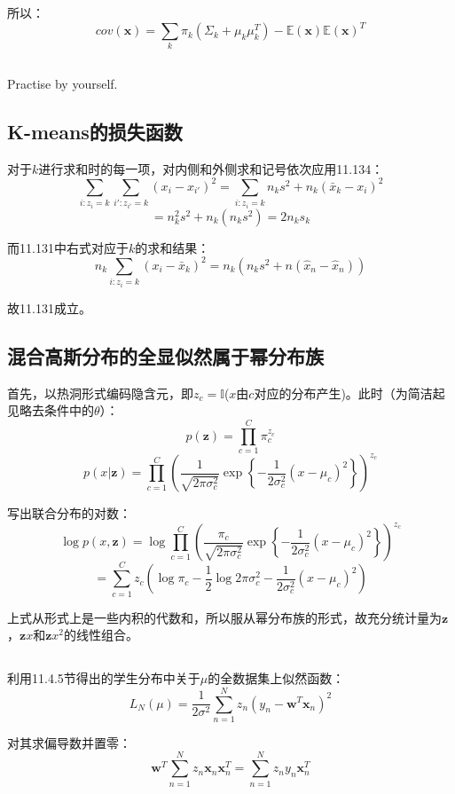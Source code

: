\documentclass[UTF8]{ctexart}
\begin{document}
所以：
$$cov(\textbf{x})=\sum_{k}\pi_{k}(\Sigma_{k}+\mu_{k}\mu_{k}^{T})-\mathbb{E}(\textbf{x})\mathbb{E}(\textbf{x})^{T}$$

\subsection{}
Practise by yourself.

\subsection{K-means的损失函数}
对于$k$进行求和时的每一项，对内侧和外侧求和记号依次应用11.134：
$$\sum_{i:z_{i}=k}\sum_{i':z_{i'}=k}(x_{i}-x_{i'})^{2}=\sum_{i:z_{i}=k}n_{k}s^{2}+n_{k}(\bar{x}_{k}-x_{i})^{2}$$
$$=n_{k}^{2}s^{2}+n_{k}(n_{k}s^{2})=2n_{k}s_{k}$$

而11.131中右式对应于$k$的求和结果：
$$n_{k}\sum_{i:z_{i}=k}(x_{i}-\bar{x}_{k})^{2}=n_{k}(n_{k}s^{2}+n(\hat{x}_{n}-\hat{x}_{n}))$$

故11.131成立。

\subsection{混合高斯分布的全显似然属于幂分布族}
首先，以热洞形式编码隐含元，即$z_{c}=\mathbb{I}$($x$由$c$对应的分布产生)。此时（为简洁起见略去条件中的$\theta$）：
$$p(\textbf{z})=\prod_{c=1}^{C}\pi_{c}^{z_{c}}$$
$$p(x|\textbf{z})=\prod_{c=1}^{C}(\frac{1}{\sqrt{2\pi \sigma_{c}^{2}}}\exp\left\{ -\frac{1}{2\sigma_{c}^{2}}(x-\mu_{c})^{2} \right\})^{z_{c}}$$

写出联合分布的对数：
$$\log p(x,\textbf{z})=\log \prod_{c=1}^{C}(\frac{\pi_{c}}{\sqrt{2\pi \sigma_{c}^{2}}}\exp\left\{ -\frac{1}{2\sigma_{c}^{2}}(x-\mu_{c})^{2} \right\})^{z_{c}}$$
$$=\sum_{c=1}^{C}z_{c}(\log \pi_{c} -\frac{1}{2}\log 2\pi \sigma_{c}^{2} - \frac{1}{2\sigma_{c}^{2}}(x-\mu_{c})^{2})$$

上式从形式上是一些内积的代数和，所以服从幂分布族的形式，故充分统计量为$\textbf{z}$，$\textbf{z}x$和$\textbf{z}x^{2}$的线性组合。

\subsection{}
利用11.4.5节得出的学生分布中关于$\mu$的全数据集上似然函数：
$$L_{N}(\mu)=\frac{1}{2\sigma^{2}} \sum_{n=1}^{N}z_{n}(y_{n}-\textbf{w}^{T}\textbf{x}_{n})^{2}$$

对其求偏导数并置零：
$$\textbf{w}^{T}\sum_{n=1}^{N}z_{n}\textbf{x}_{n}\textbf{x}_{n}^{T}=\sum_{n=1}^{N}z_{n}y_{n}\textbf{x}_{n}^{T}$$
\end{document}
